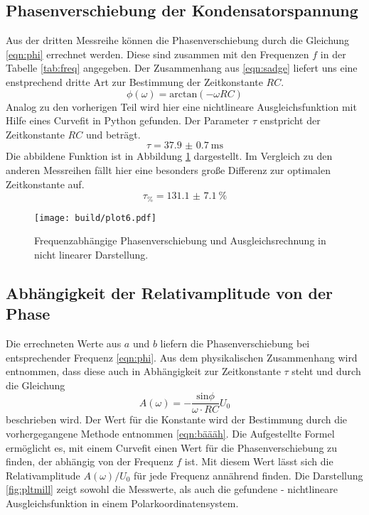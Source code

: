 \subsection{Phasenverschiebung der Kondensatorspannung}
Aus der dritten Messreihe können die Phasenverschiebung durch die Gleichung \eqref{eqn:phi} errechnet werden. Diese sind zusammen
mit den Frequenzen $f$ in der Tabelle \ref{tab:freq} angegeben.
Der Zusammenhang aus \eqref{eqn:sadge} liefert uns eine enstprechend dritte Art zur Bestimmung der Zeitkonstante $RC$.
\begin{equation}
    \phi(\omega) = \text{arctan}(-\omega RC)
\end{equation}
Analog zu den vorherigen Teil wird hier eine nichtlineare Ausgleichsfunktion mit Hilfe eines Curvefit in Python gefunden.
Der Parameter $\tau$ enstpricht der Zeitkonstante $RC$ und beträgt.
\begin{equation}
    \label{eqn:bäääh}
    \tau = \SI{37.9(07)}{\ms}
\end{equation}
Die abbildene Funktion ist in Abbildung \ref{fig:plttausend} dargestellt. Im Vergleich zu den anderen Messreihen fällt hier eine besonders
große Differenz zur optimalen Zeitkonstante auf.
\begin{equation*}
    \label{eqn:Mp1kompletterMuell}
    \tau_{\si{\percent}} = \SI{131.1(71)}{\percent}
\end{equation*}
\begin{figure}
    \centering 
    \texttt{[image: build/plot6.pdf]}
    \caption{Frequenzabhängige Phasenverschiebung und Ausgleichsrechnung in nicht linearer Darstellung.}
    \label{fig:plttausend}
\end{figure} 

\subsection{Abhängigkeit der Relativamplitude von der Phase}
Die errechneten Werte aus $a$ und $b$ liefern die Phasenverschiebung
bei entsprechender Frequenz \eqref{eqn:phi}. Aus dem physikalischen Zusammenhang wird entnommen,
dass diese auch in Abhängigkeit zur Zeitkonstante $\tau$ steht und durch die Gleichung 
\begin{equation*}
    A(\omega)=-\frac{\text{sin{$\phi$}}}{\omega \cdot RC}U_0
\end{equation*}
beschrieben wird. Der Wert für die Konstante wird der Bestimmung durch die vorhergegangene Methode entnommen \eqref{eqn:bäääh}.
Die Aufgestellte Formel ermöglicht es, mit einem Curvefit einen Wert für die Phasenverschiebung zu finden, der abhängig 
von der Frequenz $f$ ist. 
Mit diesem Wert lässt sich die Relativamplitude $A(\omega)/U_0$ für jede Frequenz annährend finden. Die Darstellung 
\ref{fig:pltmill}
zeigt sowohl die Messwerte, als auch die gefundene - nichtlineare Ausgleichsfunktion in einem Polarkoordinatensystem.

